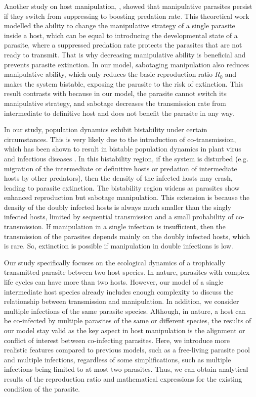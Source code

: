\documentclass[a4paper]{scrartcl}
\begin{document}
Another study on host manipulation, \cite{Iritani2018}, showed that manipulative parasites persist if they switch from suppressing to boosting predation rate.
This theoretical work modelled the ability to change the manipulative strategy of a single parasite inside a host, which can be equal to introducing the developmental state of a parasite, where a suppressed predation rate protects the parasites that are not ready to transmit.
That is why decreasing manipulative ability is beneficial and prevents parasite extinction.
In our model, sabotaging manipulation also reduces manipulative ability, which only reduces the basic reproduction ratio $R_0$ and makes the system bistable, exposing the parasite to the risk of extinction. 
This result contrasts with \cite{Iritani2018} because in our model, the parasite cannot switch its manipulative strategy, and sabotage decreases the transmission rate from intermediate to definitive host and does not benefit the parasite in any way. 

In our study, population dynamics exhibit bistability under certain circumstances. 
This is very likely due to the introduction of co-transmission, which has been shown to result in bistable population dynamics in plant virus \cite{allen_modelling_2019} and infectious diseases \cite{gao_coinfection_2016-1}.
 In this bistability region, if the system is disturbed (e.g. migration of the intermediate or definitive hosts or predation of intermediate hosts by other predators), then the density of the infected hosts may crash, leading to parasite extinction. 
The bistability region widens as parasites show enhanced reproduction but sabotage manipulation. 
This extension is because the density of the doubly infected hosts is always much smaller than the singly infected hosts, limited by sequential transmission and a small probability of co-transmission. 
If manipulation in a single infection is insufficient, then the transmission of the parasites depends mainly on the doubly infected hosts, which is rare. 
So, extinction is possible if manipulation in double infections is low.

Our study specifically focuses on the ecological dynamics of a trophically transmitted parasite between two host species. 
In nature, parasites with complex life cycles can have more than two hosts. 
However, our model of a single intermediate host species already includes enough complexity to discuss the relationship between transmission and manipulation.
In addition, we consider multiple infections of the same parasite species.
Although, in nature, a host can be co-infected by multiple parasites of the same or different species, the results of our model stay valid as the key aspect in host manipulation is the alignment or conflict of interest between co-infecting parasites.
Here, we introduce more realistic features compared to previous models, such as a free-living parasite pool and multiple infections, regardless of some simplifications, such as multiple infections being limited to at most two parasites. 
Thus, we can obtain analytical results of the reproduction ratio and mathematical expressions for the existing condition of the parasite.
\end{document}

